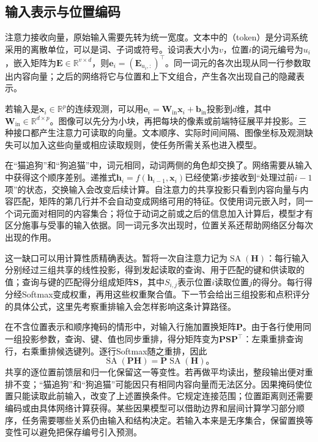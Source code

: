 \subsection{输入表示与位置编码}
\label{sec:transformer-input}

注意力接收向量，原始输入需要先转为统一宽度。文本中的（token）是分词系统采用的离散单位，可以是词、子词或符号。设词表大小为$v$，位置$i$的词元编号为$u_i$，嵌入矩阵为$\bm E\in\mathbb R^{v\times d}$，则$\bm e_i=(\bm E_{u_i,:})^{\top}$。同一词元的各次出现从同一行参数取出内容向量；之后的网络将它与位置和上下文组合，产生各次出现自己的隐藏表示。

若输入是$\bm x_i\in\mathbb R^p$的连续观测，可以用$\bm e_i=\bm W_{\mathrm{in}}\bm x_i+\bm b_{\mathrm{in}}$投影到$d$维，其中$\bm W_{\mathrm{in}}\in\mathbb R^{d\times p}$。图像可以先分为小块，再把每块的像素或前端特征展平并投影。三种接口都产生注意力可读取的向量。文本顺序、实际时间间隔、图像坐标及观测缺失可以加入这些向量或相应读取规则，使任务所需关系也进入模型。

在“猫追狗”和“狗追猫”中，词元相同，动词两侧的角色却交换了。网络需要从输入中获得这个顺序差别。递推式$\bm h_i=f(\bm h_{i-1},\bm x_i)$已经使第$i$步接收到“处理过前$i-1$项”的状态，交换输入会改变后续计算。自注意力的共享投影只看到内容向量与内容匹配，矩阵的第几行并不会自动变成网络可用的特征。仅使用词元嵌入时，同一个词元面对相同的内容集合；将位于动词之前或之后的信息加入计算后，模型才有区分施事与受事的输入依据。同一词元多次出现时，位置关系还帮助网络区分每次出现的作用。

这一缺口可以用计算性质精确表达。暂将一次自注意力记为$\operatorname{SA}(\bm H)$：每行输入分别经过三组共享的线性投影，得到发起读取的查询、用于匹配的键和供读取的值；查询与键的匹配得分组成矩阵$\bm S$，其中$S_{i,j}$表示位置$i$读取位置$j$的得分。每行得分经Softmax变成权重，再用这些权重聚合值。下一节会给出三组投影和点积评分的具体公式，这里先考察重排输入会怎样影响这条计算路径。

在不含位置表示和顺序掩码的情形中，对输入行施加置换矩阵$\bm P$。由于各行使用同一组投影参数，查询、键、值也同步重排，得分矩阵变为$\bm P\bm S\bm P^{\top}$：左乘重排查询行，右乘重排候选键列。逐行Softmax随之重排，因此
\begin{equation}
  \operatorname{SA}(\bm P\bm H)
  =\bm P\operatorname{SA}(\bm H)\text{。}
  \label{eq:transformer-permutation}
\end{equation}
共享的逐位置前馈层和归一化保留这一等变性。若再做平均读出，整段输出便对重排不变；“猫追狗”和“狗追猫”可能因只有相同内容向量而无法区分。因果掩码使位置只能读取此前输入，改变了上述置换条件。它规定连接范围；位置距离则还需要编码或由具体网络计算获得。某些因果模型可以借助边界和层间计算学习部分顺序，任务需要哪些关系仍由输入和结构决定。若输入本来是无序集合，保留置换等变性可以避免把保存编号引入预测。


